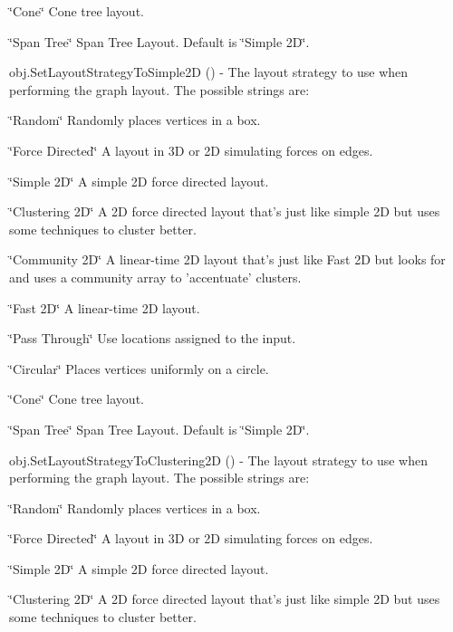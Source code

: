 \begin{DoxyItemize}
\begin{DoxyItemize}
\item \char`\"{}\-Cone\char`\"{} Cone tree layout.
\item \char`\"{}\-Span Tree\char`\"{} Span Tree Layout. Default is \char`\"{}\-Simple 2\-D\char`\"{}.  
\end{DoxyItemize}
\item {\ttfamily obj.\-Set\-Layout\-Strategy\-To\-Simple2\-D ()} -\/ The layout strategy to use when performing the graph layout. The possible strings are\-:
\begin{DoxyItemize}
\item \char`\"{}\-Random\char`\"{} Randomly places vertices in a box.
\item \char`\"{}\-Force Directed\char`\"{} A layout in 3\-D or 2\-D simulating forces on edges.
\item \char`\"{}\-Simple 2\-D\char`\"{} A simple 2\-D force directed layout.
\item \char`\"{}\-Clustering 2\-D\char`\"{} A 2\-D force directed layout that's just like simple 2\-D but uses some techniques to cluster better.
\item \char`\"{}\-Community 2\-D\char`\"{} A linear-\/time 2\-D layout that's just like Fast 2\-D but looks for and uses a community array to 'accentuate' clusters.
\item \char`\"{}\-Fast 2\-D\char`\"{} A linear-\/time 2\-D layout.
\item \char`\"{}\-Pass Through\char`\"{} Use locations assigned to the input.
\item \char`\"{}\-Circular\char`\"{} Places vertices uniformly on a circle.
\item \char`\"{}\-Cone\char`\"{} Cone tree layout.
\item \char`\"{}\-Span Tree\char`\"{} Span Tree Layout. Default is \char`\"{}\-Simple 2\-D\char`\"{}.  
\end{DoxyItemize}
\item {\ttfamily obj.\-Set\-Layout\-Strategy\-To\-Clustering2\-D ()} -\/ The layout strategy to use when performing the graph layout. The possible strings are\-:
\begin{DoxyItemize}
\item \char`\"{}\-Random\char`\"{} Randomly places vertices in a box.
\item \char`\"{}\-Force Directed\char`\"{} A layout in 3\-D or 2\-D simulating forces on edges.
\item \char`\"{}\-Simple 2\-D\char`\"{} A simple 2\-D force directed layout.
\item \char`\"{}\-Clustering 2\-D\char`\"{} A 2\-D force directed layout that's just like simple 2\-D but uses some techniques to cluster better.

\end{DoxyItemize}
\end{DoxyItemize}
